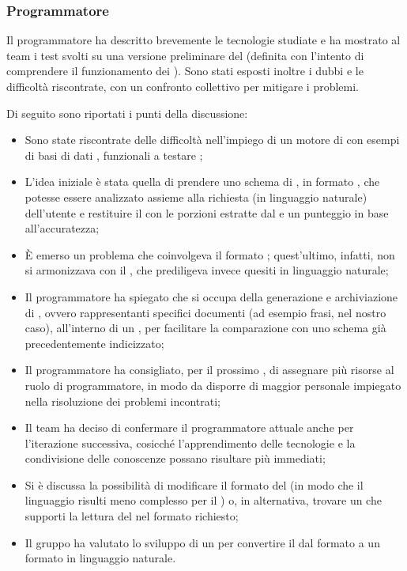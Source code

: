 \subsubsection{Programmatore}
\par Il programmatore ha descritto brevemente le tecnologie studiate e ha mostrato al team i test svolti su una versione preliminare del  (definita con l'intento di comprendere il funzionamento dei ). Sono stati esposti inoltre i dubbi e le difficoltà riscontrate, con un confronto collettivo per mitigare i problemi.
\par Di seguito sono riportati i punti della discussione:
\begin{itemize}
	\item Sono state riscontrate delle difficoltà nell'impiego di un motore di  con esempi di basi di dati , funzionali a testare ;
	\item L'idea iniziale è stata quella di prendere uno schema di , in formato , che potesse essere analizzato assieme alla richiesta (in linguaggio naturale) dell'utente e restituire il  con le porzioni estratte dal  e un punteggio in base all'accuratezza;
	\item È emerso un problema che coinvolgeva il formato ; quest'ultimo, infatti, non si armonizzava con il , che prediligeva invece quesiti in linguaggio naturale;
	\item Il programmatore ha spiegato che  si occupa della generazione e archiviazione di , ovvero  rappresentanti specifici documenti (ad esempio frasi, nel nostro caso), all'interno di un , per facilitare la comparazione con uno schema già precedentemente indicizzato;
	\item Il programmatore ha consigliato, per il prossimo , di assegnare più risorse al ruolo di programmatore, in modo da disporre di maggior personale impiegato nella risoluzione dei problemi incontrati;
	\item Il team ha deciso di confermare il programmatore attuale anche per l’iterazione successiva, cosicché l'apprendimento delle tecnologie e la condivisione delle conoscenze possano risultare più immediati;
	\item Si è discussa la possibilità di modificare il formato del  (in modo che il linguaggio risulti meno complesso per il ) o, in alternativa, trovare un  che supporti la lettura del  nel formato richiesto;
	\item Il gruppo ha valutato lo sviluppo di un  per convertire il  dal formato  a un formato in linguaggio naturale.
\end{itemize}

